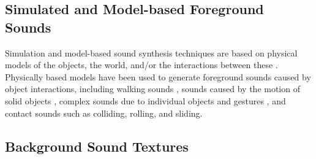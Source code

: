 \documentclass[a4paper]{article}
\begin{document}


\subsection{Simulated and Model-based Foreground Sounds}

Simulation and model-based sound synthesis techniques are based on physical models of the 
objects, the world, and/or the interactions between these \cite{CookBook}. 
Physically based models have been used to generate foreground sounds  
caused by object interactions, including walking sounds \cite{Cook02}, sounds caused by the motion of 
solid objects \cite{OBrien01}, complex sounds due to individual objects and gestures 
\cite{Rocchesso03}, and contact sounds \cite{Doel01} such as colliding, rolling, and 
sliding. 





\subsection{Background Sound Textures}
\end{document}
